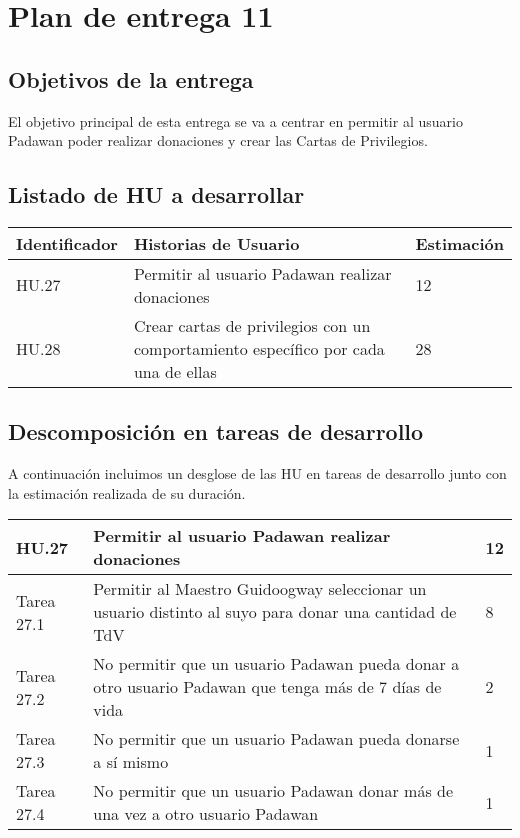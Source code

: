 \section{Plan de entrega 11}

\subsection{Objetivos de la entrega}

El objetivo principal de esta entrega se va a centrar en permitir al usuario Padawan poder realizar donaciones y crear las Cartas de Privilegios.

\subsection{Listado de HU a desarrollar}

\begin{table}[h]
	\centering
	\begin{tabular}{| p{2.3cm} | p{6.7cm} | p{2cm} |}
		\rowcolor[HTML]{329A9D} 
		{\color[HTML]{FFFFFF} \textbf{Identificador}} & {\color[HTML]{FFFFFF} \textbf{Historias de Usuario}} & {\color[HTML]{FFFFFF} \textbf{Estimación}}  \\ \hline
		HU.27 & Permitir al usuario Padawan realizar donaciones & 12 \\ \hline
		HU.28 & Crear cartas de privilegios con un comportamiento específico por cada una de ellas & 28 \\ \hline
	\end{tabular}
\end{table}

\newpage

\subsection{Descomposición en tareas de desarrollo}

A continuación incluimos un desglose de las HU en tareas de desarrollo junto con la estimación realizada de su duración.\\

\begin{table}[h]
	\centering
	\begin{tabular}{| p{2.3cm} | p{6.7cm} | p{2cm} |}
		\rowcolor[HTML]{329A9D} 
		{\color[HTML]{FFFFFF} \textbf{HU.27}} & {\color[HTML]{FFFFFF} \textbf{Permitir al usuario Padawan realizar donaciones}} & {\color[HTML]{FFFFFF} \textbf{12}}  \\ \hline
		Tarea 27.1 & Permitir al Maestro Guidoogway seleccionar un usuario distinto al suyo para donar una cantidad de TdV & 8 \\ \hline
		Tarea 27.2 & No permitir que un usuario Padawan pueda donar a otro usuario Padawan que tenga más de 7 días de vida & 2 \\ \hline
		Tarea 27.3 & No permitir que un usuario Padawan pueda donarse a sí mismo & 1 \\ \hline
		Tarea 27.4 & No permitir que un usuario Padawan donar más de una vez a otro usuario Padawan & 1 \\ \hline
	\end{tabular}
\end{table}

